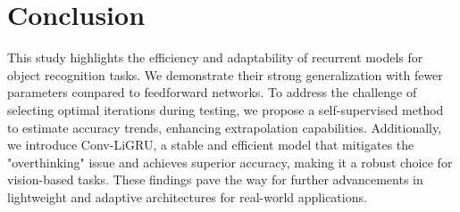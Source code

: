 \section{Conclusion}
This study highlights the efficiency and adaptability of recurrent models for object recognition tasks. We demonstrate their strong generalization with fewer parameters compared to feedforward networks. To address the challenge of selecting optimal iterations during testing, we propose a self-supervised method to estimate accuracy trends, enhancing extrapolation capabilities. Additionally, we introduce Conv-LiGRU, a stable and efficient model that mitigates the "overthinking" issue and achieves superior accuracy, making it a robust choice for vision-based tasks. These findings pave the way for further advancements in lightweight and adaptive architectures for real-world applications.

\newpage
